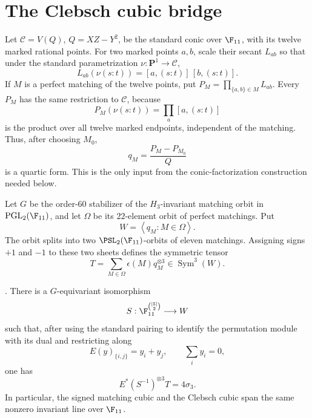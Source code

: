 \section{The Clebsch cubic bridge}
\label{sec:cubic}

Let \(\mathcal C=V(Q)\), \(Q=XZ-Y^2\), be the standard conic over
\(\F_{11}\), with its twelve marked rational points.  For two marked
points \(a,b\), scale their secant \(L_{ab}\) so that under the standard
parametrization \(\nu:\mathbf P^1\to\mathcal C\),
\[
 L_{ab}(\nu(s:t))=[a,(s:t)]\,[b,(s:t)].
\]
If \(M\) is a perfect matching of the twelve points, put
\(P_M=\prod_{\{a,b\}\in M}L_{ab}\).  Every \(P_M\) has the same
restriction to \(\mathcal C\), because
\[
 P_M(\nu(s:t))=\prod_a[a,(s:t)]
\]
is the product over all twelve marked endpoints, independent of the
matching.  Thus, after choosing \(M_0\),
\[
 q_M=\frac{P_M-P_{M_0}}{Q}
\]
is a quartic form.  This is the only input from the conic-factorization
construction needed below.

Let \(G\) be the order-\(60\) stabilizer of the \(H_3\)-invariant matching
orbit in \(\operatorname{PGL}_2(\F_{11})\), and let \(\Omega\) be its
\(22\)-element orbit of perfect matchings.  Put
\[
 W=\left\langle q_M:M\in\Omega\right\rangle .
\]
The orbit splits into two \(\PSL_2(\F_{11})\)-orbits of eleven
matchings.  Assigning signs \(+1\) and \(-1\) to these two sheets defines
the symmetric tensor
\[
 T=\sum_{M\in\Omega}\epsilon(M)q_M^{\otimes3}
 \in\operatorname{Sym}^3(W).
\]

\begin{theorem}
\label{thm:finite-tensor-bridge}
.
There is a \(G\)-equivariant isomorphism
\[
 S:\F_{11}^{\binom{[5]}2}\longrightarrow W
\]
such that, after using the standard pairing to identify the permutation
module with its dual and restricting along
\[
 E(y)_{\{i,j\}}=y_i+y_j,\qquad \sum_i y_i=0,
\]
one has
\[
 E^*(S^{-1})^{\otimes3}T=4\sigma_3.
\]
In particular, the signed matching cubic and the Clebsch cubic span the
same nonzero invariant line over \(\F_{11}\).
\end{theorem}

